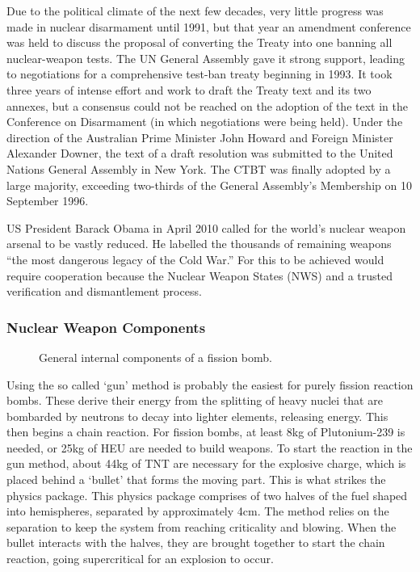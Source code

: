 \documentclass[twoside,titlepage,11pt,twocolumn,a4paper]{article}
\begin{document}
Due to the political climate of the next few decades, very little
progress was made in nuclear disarmament until 1991, but that year an
amendment conference was held to discuss the proposal of converting
the Treaty into one banning all nuclear-weapon tests. The UN General
Assembly gave it strong support, leading to negotiations for a
comprehensive test-ban treaty beginning in 1993. It took three years
of intense effort and work to draft the Treaty text and its two
annexes, but a consensus could not be reached on the adoption of the
text in the Conference on Disarmament (in which negotiations were
being held). Under the direction of the Australian Prime Minister John
Howard and Foreign Minister Alexander Downer, the text of a draft
resolution was submitted to the United Nations General Assembly in New
York. The CTBT was finally adopted by a large majority, exceeding
two-thirds of the General Assembly's Membership on 10 September 1996.

US President Barack Obama in April 2010 called for the world's
nuclear weapon arsenal to be vastly reduced. He labelled the thousands
of remaining weapons ``the most dangerous legacy of the Cold War.''
For this to be achieved would require cooperation because the Nuclear
Weapon States (NWS) and a trusted verification and dismantlement
process.

\subsubsection{Nuclear Weapon Components}
\begin{figure}
   
  \caption{General internal components of a fission
    bomb. \citep{fissionBomb}}
\end{figure}

Using the so called `gun' method is probably the easiest for purely
fission reaction bombs. These derive their energy from the splitting
of heavy nuclei that are bombarded by neutrons to decay into lighter
elements, releasing energy. This then begins a chain reaction. For
fission bombs, at least 8kg of Plutonium-239 is needed, or 25kg of HEU
are needed to build weapons. \citep{cochran1995} To start the reaction
in the gun method, about 44kg of TNT are necessary
\citep{howToMakeBomb} for the explosive charge, which is placed behind
a `bullet' that forms the moving part. This is what strikes the
physics package. This physics package comprises of two halves of the
fuel shaped into hemispheres, separated by approximately 4cm. The
method relies on the separation to keep the system from reaching
criticality and blowing. When the bullet interacts with the halves,
they are brought together to start the chain reaction, going
supercritical for an explosion to occur.
\end{document}
